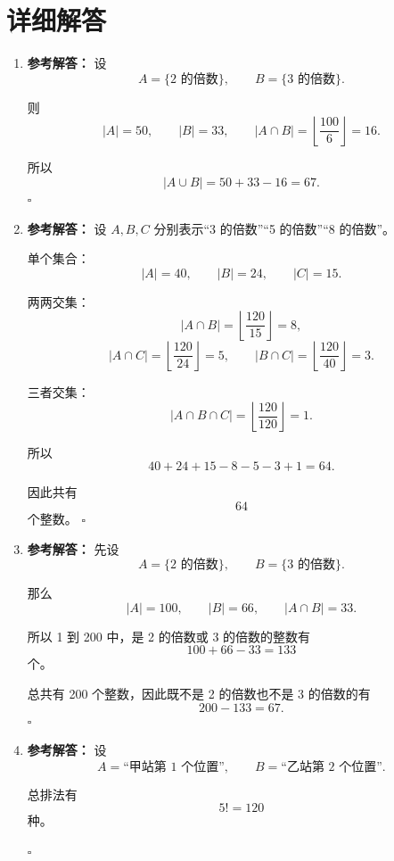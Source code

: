 \documentclass[11pt,a4paper,fontset=fandol]{ctexart}
\newenvironment{solution}{\par\noindent\textbf{参考解答：}}{\hfill$\square$\par}
\begin{document}
\newpage
\section{详细解答}

\begin{enumerate}
  \item \begin{solution}
  设
  \[
  A=\{\text{2 的倍数}\},\qquad B=\{\text{3 的倍数}\}.
  \]

  则
  \[
  |A|=50,
  \qquad
  |B|=33,
  \qquad
  |A\cap B|=\left\lfloor\frac{100}{6}\right\rfloor=16.
  \]

  所以
  \[
  |A\cup B|=50+33-16=67.
  \]
  \end{solution}

  \item \begin{solution}
  设 $A,B,C$ 分别表示“3 的倍数”“5 的倍数”“8 的倍数”。

  单个集合：
  \[
  |A|=40,
  \qquad
  |B|=24,
  \qquad
  |C|=15.
  \]

  两两交集：
  \[
  |A\cap B|=\left\lfloor\frac{120}{15}\right\rfloor=8,
  \]
  \[
  |A\cap C|=\left\lfloor\frac{120}{24}\right\rfloor=5,
  \qquad
  |B\cap C|=\left\lfloor\frac{120}{40}\right\rfloor=3.
  \]

  三者交集：
  \[
  |A\cap B\cap C|=\left\lfloor\frac{120}{120}\right\rfloor=1.
  \]

  所以
  \[
  40+24+15-8-5-3+1=64.
  \]

  因此共有
  \[
  64
  \]
  个整数。
  \end{solution}

  \item \begin{solution}
  先设
  \[
  A=\{\text{2 的倍数}\},\qquad B=\{\text{3 的倍数}\}.
  \]

  那么
  \[
  |A|=100,
  \qquad
  |B|=66,
  \qquad
  |A\cap B|=33.
  \]

  所以 1 到 200 中，是 2 的倍数或 3 的倍数的整数有
  \[
  100+66-33=133
  \]
  个。

  总共有 200 个整数，因此既不是 2 的倍数也不是 3 的倍数的有
  \[
  200-133=67.
  \]
  \end{solution}

  \item \begin{solution}
  设
  \[
  A=\text{“甲站第 1 个位置”},\qquad B=\text{“乙站第 2 个位置”}.
  \]

  总排法有
  \[
  5!=120
  \]
  种。


\end{solution}
\end{enumerate}
\end{document}
